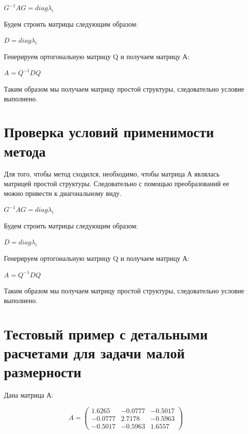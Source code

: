 \begin{math}
	G^{-1}AG=diag{\lambda_{i}}
\end{math}

Будем строить матрицы следующим образом: 

\begin{math}
	D=diag{\lambda_{i}}
\end{math}

Генерируем ортогональную матрицу Q и получаем матрицу А:

\begin{math}
	A=Q^{-1}DQ
\end{math}

Таким образом мы получаем матрицу простой структуры, следовательно условие выполнено.

\section{Проверка условий применимости метода}

Для того, чтобы метод сходился, необходимо, чтобы матрица А являлась матрицей простой структуры. Следовательно с помощью преобразований ее можно привести к диагональному виду. 

\begin{math}
	G^{-1}AG=diag{\lambda_{i}}
\end{math}

Будем строить матрицы следующим образом: 

\begin{math}
	D=diag{\lambda_{i}}
\end{math}

Генерируем ортогональную матрицу Q и получаем матрицу А:

\begin{math}
	A=Q^{-1}DQ
\end{math}

Таким образом мы получаем матрицу простой структуры, следовательно условие выполнено.


\section{Тестовый пример с детальными расчетами для задачи малой размерности}

Дана матрица А:

\begin{equation*}
	A =
	\begin{pmatrix}
		1.6265  & -0.0777 & -0.5017\\
		-0.0777 & 2.7178 & -0.5963\\
		-0.5017 & -0.5963 & 1.6557
	\end{pmatrix}
\end{equation*}

